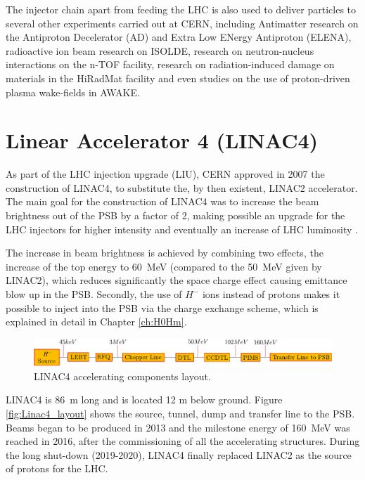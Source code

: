 The injector chain apart from feeding the LHC is also used to deliver particles to several other experiments carried out at CERN, including Antimatter research on the Antiproton Decelerator (AD) and Extra Low ENergy Antiproton (ELENA), radioactive ion beam research on ISOLDE, research on neutron-nucleus interactions on the n-TOF facility, research on radiation-induced damage on materials in the HiRadMat facility and even studies on the use of proton-driven plasma wake-fields in AWAKE. 

\section{Linear Accelerator 4 (LINAC4)}
\label{sec:LINAC4}

As part of the LHC injection upgrade (LIU), CERN approved in 2007 the construction of LINAC4, to substitute the, by then existent, LINAC2 accelerator. The main goal for the construction of LINAC4 was to increase the beam brightness out of the PSB by a factor of 2, making possible an upgrade for the LHC injectors for higher intensity and eventually an increase of LHC luminosity \parencite*[]{ref:LIU}. 

The increase in beam brightness is achieved by combining two effects, the increase of the top energy to \SIlist[]{60}{\mega \electronvolt} (compared to the \SI[]{50}{\mega \electronvolt} given by LINAC2), which reduces significantly the space charge effect causing emittance blow up in the PSB. Secondly, the use of $H^{-}$ ions instead of protons makes it possible to inject into the PSB via the charge exchange scheme, which is explained in detail in Chapter \ref{ch:H0Hm}.

\begin{figure}[h]
    \centering
    \includegraphics[width=1.0\columnwidth]{Linac4_AcceleratingPart/Linac4_acc.pdf}
    \caption{LINAC4 accelerating components layout. }
    \label{fig:Linac4_acc}
\end{figure}

LINAC4 is \SI[]{86}{\metre} long and is located 12 m below ground. Figure \ref{fig:Linac4_layout} shows the source, tunnel, dump and transfer line to the PSB. Beams began to be produced in 2013 and the milestone energy of \SIlist[]{160}{\mega \electronvolt} was reached in 2016, after the commissioning of all the accelerating structures. During the long shut-down (2019-2020), LINAC4 finally replaced LINAC2 as the source of protons for the LHC. 

